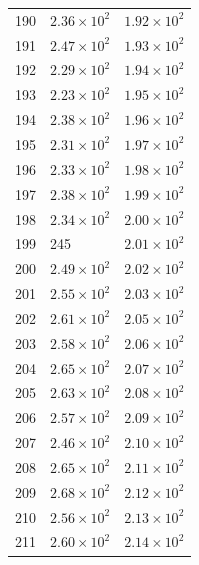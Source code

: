\begin{table}[H]
\begin{tabular}{lll}
190 & $\displaystyle 2.36 \times 10^{2}$ & $\displaystyle 1.92 \times 10^{2}$ \\
191 & $\displaystyle 2.47 \times 10^{2}$ & $\displaystyle 1.93 \times 10^{2}$ \\
192 & $\displaystyle 2.29 \times 10^{2}$ & $\displaystyle 1.94 \times 10^{2}$ \\
193 & $\displaystyle 2.23 \times 10^{2}$ & $\displaystyle 1.95 \times 10^{2}$ \\
194 & $\displaystyle 2.38 \times 10^{2}$ & $\displaystyle 1.96 \times 10^{2}$ \\
195 & $\displaystyle 2.31 \times 10^{2}$ & $\displaystyle 1.97 \times 10^{2}$ \\
196 & $\displaystyle 2.33 \times 10^{2}$ & $\displaystyle 1.98 \times 10^{2}$ \\
197 & $\displaystyle 2.38 \times 10^{2}$ & $\displaystyle 1.99 \times 10^{2}$ \\
198 & $\displaystyle 2.34 \times 10^{2}$ & $\displaystyle 2.00 \times 10^{2}$ \\
199 & 245 & $\displaystyle 2.01 \times 10^{2}$ \\
200 & $\displaystyle 2.49 \times 10^{2}$ & $\displaystyle 2.02 \times 10^{2}$ \\
201 & $\displaystyle 2.55 \times 10^{2}$ & $\displaystyle 2.03 \times 10^{2}$ \\
202 & $\displaystyle 2.61 \times 10^{2}$ & $\displaystyle 2.05 \times 10^{2}$ \\
203 & $\displaystyle 2.58 \times 10^{2}$ & $\displaystyle 2.06 \times 10^{2}$ \\
204 & $\displaystyle 2.65 \times 10^{2}$ & $\displaystyle 2.07 \times 10^{2}$ \\
205 & $\displaystyle 2.63 \times 10^{2}$ & $\displaystyle 2.08 \times 10^{2}$ \\
206 & $\displaystyle 2.57 \times 10^{2}$ & $\displaystyle 2.09 \times 10^{2}$ \\
207 & $\displaystyle 2.46 \times 10^{2}$ & $\displaystyle 2.10 \times 10^{2}$ \\
208 & $\displaystyle 2.65 \times 10^{2}$ & $\displaystyle 2.11 \times 10^{2}$ \\
209 & $\displaystyle 2.68 \times 10^{2}$ & $\displaystyle 2.12 \times 10^{2}$ \\
210 & $\displaystyle 2.56 \times 10^{2}$ & $\displaystyle 2.13 \times 10^{2}$ \\
211 & $\displaystyle 2.60 \times 10^{2}$ & $\displaystyle 2.14 \times 10^{2}$ \\

\end{tabular}
\end{table}
